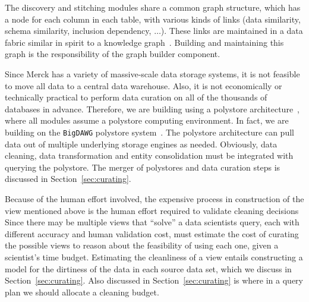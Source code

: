 The discovery and stitching modules share a common graph structure, which has a node for each column in each table, with various kinds of links (data similarity, schema similarity, inclusion dependency, $\dots$).  These links are maintained in a data fabric similar in spirit to a knowledge graph~\cite{DBLP:conf/semweb/AuerBKLCI07,DBLP:conf/sigmod/BollackerEPST08,DBLP:conf/www/SuchanekKW07}. Building and maintaining this graph is the responsibility of the graph builder component. 



 Since Merck has a variety of massive-scale data storage systems, it is not feasible to move all data to a central data warehouse. Also, it is not economically or technically practical to perform data curation on all of the thousands of databases in advance.  Therefore, we are building \dcv using a polystore architecture~\cite{DBLP:journals/sigmod/DugganESBHKMMMZ15}, where all modules assume a polystore computing environment. In fact, we are building on the \texttt{BigDAWG} polystore system~\cite{DBLP:journals/pvldb/ElmoreDSBCGHHKK15}. The polystore architecture can pull data out of multiple underlying storage engines as needed. Obviously, data cleaning, data transformation and entity consolidation must be integrated with querying the polystore.  The merger of polystores and data curation steps is discussed in Section~\ref{sec:curating}.



 Because of the human effort involved, the expensive process in construction of the view mentioned above is the human effort required to validate cleaning decisions Since there may be multiple views that ``solve'' a data scientists query, each with different accuracy and human validation cost, \dcv must estimate the cost of curating the possible views to reason about the feasibility of using each one, given a scientist's time budget. Estimating the cleanliness of a view entails constructing a model for the dirtiness of the data in each source data set, which we discuss in Section~\ref{sec:curating}. Also discussed in Section~\ref{sec:curating} is where in a query plan we should allocate a cleaning budget.



